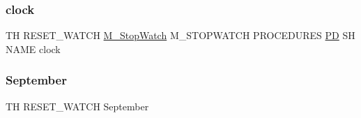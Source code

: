 \subsubsection{\texorpdfstring{clock}{clock}}
{\footnotesize\ttfamily TH R\+E\+S\+E\+T\+\_\+\+W\+A\+T\+CH \hyperlink{option__stopwatch_83_8txt_aa2011fc45a5e502e87ee50996a8a9305}{M\+\_\+\+Stop\+Watch} M\+\_\+\+S\+T\+O\+P\+W\+A\+T\+CH P\+R\+O\+C\+E\+D\+U\+R\+ES \hyperlink{what__overview_81_8txt_a85f26da5a4481fbdb0d9c79f2b94de3e}{PD} SH N\+A\+ME clock}

\mbox{\label{reset__watch_83_8txt_a75ad10929d982abab45eddd5a9ee9490}} 
\subsubsection{\texorpdfstring{September}{September}}
{\footnotesize\ttfamily TH R\+E\+S\+E\+T\+\_\+\+W\+A\+T\+CH September}


